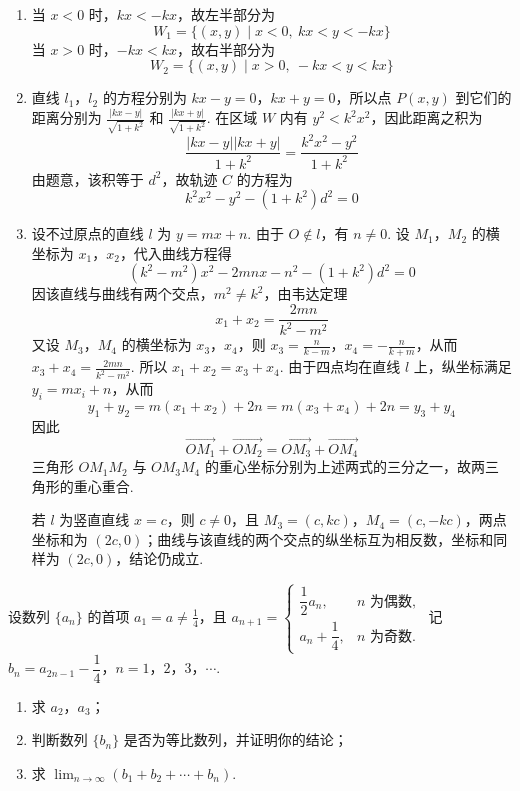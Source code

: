 \begin{solution}
\begin{enumerate}
\item 当 \(x<0\) 时，\(kx<-kx\)，故左半部分为
\[
W_1=\{(x,y)\mid x<0,\ kx<y<-kx\}
\]
当 \(x>0\) 时，\(-kx<kx\)，故右半部分为
\[
W_2=\{(x,y)\mid x>0,\ -kx<y<kx\}
\]

\item 直线 \(l_1\)，\(l_2\) 的方程分别为 \(kx-y=0\)，\(kx+y=0\)，所以点 \(P(x,y)\) 到它们的距离分别为 \(\frac{|kx-y|}{\sqrt{1+k^2}}\) 和 \(\frac{|kx+y|}{\sqrt{1+k^2}}\).
在区域 \(W\) 内有 \(y^2<k^2x^2\)，因此距离之积为
\[
\frac{|kx-y||kx+y|}{1+k^2}=\frac{k^2x^2-y^2}{1+k^2}
\]
由题意，该积等于 \(d^2\)，故轨迹 \(C\) 的方程为
\[
k^2x^2-y^2-(1+k^2)d^2=0
\]

\item 设不过原点的直线 \(l\) 为 \(y=mx+n\). 由于 \(O\notin l\)，有 \(n\ne0\). 设 \(M_1\)，\(M_2\) 的横坐标为 \(x_1\)，\(x_2\)，代入曲线方程得
\[
(k^2-m^2)x^2-2mnx-n^2-(1+k^2)d^2=0
\]
因该直线与曲线有两个交点，\(m^2\ne k^2\)，由韦达定理
\[
x_1+x_2=\frac{2mn}{k^2-m^2}
\]
又设 \(M_3\)，\(M_4\) 的横坐标为 \(x_3\)，\(x_4\)，则 \(x_3=\frac{n}{k-m}\)，\(x_4=-\frac{n}{k+m}\)，从而 \(x_3+x_4=\frac{2mn}{k^2-m^2}\).
所以 \(x_1+x_2=x_3+x_4\). 由于四点均在直线 \(l\) 上，纵坐标满足 \(y_i=mx_i+n\)，从而
\[
y_1+y_2=m(x_1+x_2)+2n=m(x_3+x_4)+2n=y_3+y_4
\]
因此
\[
\overrightarrow{OM_1}+\overrightarrow{OM_2}=\overrightarrow{OM_3}+\overrightarrow{OM_4}
\]
三角形 \(OM_1M_2\) 与 \(OM_3M_4\) 的重心坐标分别为上述两式的三分之一，故两三角形的重心重合.

若 \(l\) 为竖直直线 \(x=c\)，则 \(c\ne0\)，且 \(M_3=(c,kc)\)，\(M_4=(c,-kc)\)，两点坐标和为 \((2c,0)\)；曲线与该直线的两个交点的纵坐标互为相反数，坐标和同样为 \((2c,0)\)，结论仍成立.
\end{enumerate}
\end{solution}

\begin{problem}
设数列 \(\{a_n\}\) 的首项 \(a_1=a\neq\frac{1}{4}\)，且
\(a_{n+1}=
\begin{cases}
\dfrac{1}{2}a_n, & n\text{ 为偶数},\\
a_n+\dfrac{1}{4}, & n\text{ 为奇数}.
\end{cases}\)
记 \(b_n=a_{2n-1}-\dfrac{1}{4}\)，\(n=1\)，\(2\)，\(3\)，\(\cdots\).

\begin{enumerate}
\item 求 \(a_2\)，\(a_3\)；
\item 判断数列 \(\{b_n\}\) 是否为等比数列，并证明你的结论；
\item 求 \(\displaystyle\lim_{n\to\infty}\left(b_1+b_2+\cdots+b_n\right)\).
\end{enumerate}
\end{problem}

